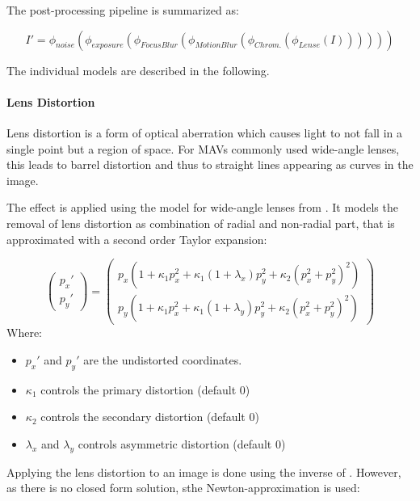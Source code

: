 The post-processing pipeline is summarized as:

\begin{equation}
	I' = \phi_{noise}(\phi_{exposure}(\phi_{FocusBlur}(\phi_{MotionBlur}(\phi_{Chrom.}(\phi_{Lense}(I))))))
	\label{eq:postprocess}
\end{equation}

The individual models are described in the following.

\paragraph{Lens Distortion}

Lens distortion is a form of optical aberration which causes light to not fall in a single point but a region of space. For \acp{MAV} commonly used wide-angle lenses, this leads to barrel distortion and thus to straight lines appearing as curves in the image.

The effect is applied using the model for wide-angle lenses from \cite{Vass}. It models the removal of lens distortion as combination of radial and non-radial part, that is approximated with a second order Taylor expansion:

\begin{equation}
\begin{pmatrix}
	p_x' \\
	p_y'
\end{pmatrix} = \begin{pmatrix}
p_x(1 + \kappa_1 p_x^2 + \kappa_1 (1 + \lambda _x)p_y^2 + \kappa_2(p_x^2 + p_y^2)^2) \\
p_y(1 + \kappa_1 p_x^2 + \kappa_1 (1 + \lambda _y)p_y^2 + \kappa_2(p_x^2 + p_y^2)^2)
\end{pmatrix} 
\label{eq:distortion}
\end{equation}
Where:
\begin{itemize}
	\item $p_x'$ and $p_y'$ are the undistorted coordinates.
	\item $\kappa_1$ controls the primary distortion (default 0)
	\item $\kappa_2$ controls the secondary distortion (default 0)
	\item $\lambda_x$ and $\lambda_y$ controls asymmetric distortion (default 0)
\end{itemize}
 
Applying the lens distortion to an image is done using the inverse of . However, as there is no closed form solution, sthe Newton-approximation is used:

